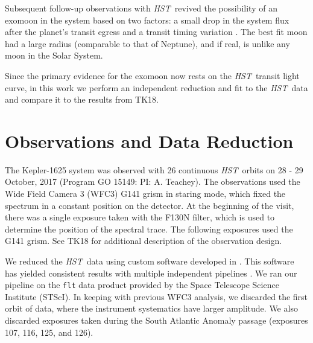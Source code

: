 \documentclass[twocolumn,trackchanges]{aastex62}
\newcommand{\project}[1]{\textsl{#1}}
\newcommand{\HST}{\project{HST}}
\newcommand{\Kepler}{\project{Kepler}}
\begin{document}
Subsequent follow-up observations with \HST\ revived the possibility of an exomoon in the system based on two factors: a small drop in the system flux after the planet's transit egress and a transit timing variation \citep[][ hereafter TK18]{teachey18b}. The best fit moon had a large radius (comparable to that of Neptune), and if real, is unlike any moon in the Solar System.

Since the primary evidence for the exomoon now rests on the \HST\ transit light curve, in this work we perform an independent reduction and fit to the \HST\ data and compare it to the results from TK18. 







\section{Observations and Data Reduction} \label{sec:data}
The Kepler-1625 system was observed with 26 continuous \HST\ orbits on 28 - 29 October, 2017 (Program GO 15149: PI: A. Teachey). The observations used the Wide Field Camera 3 (WFC3) G141 grism in staring mode, which fixed the spectrum in a constant position on the detector.  At the beginning of the visit, there was a single exposure taken with the F130N filter, which is used to determine the position of the spectral trace. The following exposures used the G141 grism.  See TK18 for additional description of the observation design.


We reduced the \HST\ data using custom software developed in \cite{kreidberg14a}.  This software has yielded consistent results with multiple independent pipelines \citep[e.g.][]{knutson14b, spake18}.  We ran our pipeline on the \texttt{flt} data product provided by the Space Telescope Science Institute (STScI).  In keeping with previous WFC3 analysis, we discarded the first orbit of data, where the instrument systematics have larger amplitude. We also discarded exposures taken during the South Atlantic Anomaly passage (exposures 107, 116, 125, and 126).
\end{document}
